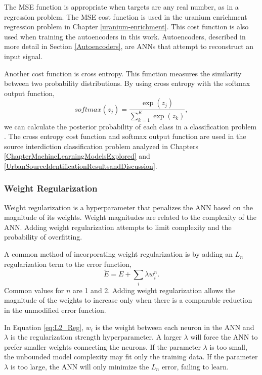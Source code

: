 The MSE function is appropriate when targets are any real number, as in a regression problem. The MSE cost function is used in the uranium enrichment regression problem in Chapter \ref{uranium-enrichment}. This cost function is also used when training the autoencoders in this work. Autoencoders, described in more detail in Section \ref{Autoencoders}, are ANNs that attempt to reconstruct an input signal.

Another cost function is cross entropy. This function measures the similarity between two probability distributions. By using cross entropy with the softmax output function,
%
\begin{equation} \label{eq:softmax}
softmax(z_j) = \frac{\exp(z_j)} {\sum_{k=1}^{K} \exp(z_k)},
\end{equation}
%
we can calculate the posterior probability of each class in a classification problem \cite{Bridle1990}. The cross entropy cost function and softmax output function are used in the source interdiction classification problem analyzed in Chapters \ref{ChapterMachineLearningModelsExplored} and \ref{UrbanSourceIdentificationResultsandDiscussion}.



\subsubsection{Weight Regularization}

Weight regularization is a hyperparameter that penalizes the ANN based on the magnitude of its weights. Weight magnitudes are related to the complexity of the ANN. Adding weight regularization attempts to limit complexity and the probability of overfitting.

A common method of incorporating weight regularization is by adding an $L_n$ regularization term to the error function, 
%
\begin{equation} \label{eq:L2_Reg}
\tilde{E} = E + \sum_i \lambda w_i^n.
\end{equation}
%
Common values for $n$ are 1 and 2. Adding weight regularization allows the magnitude of the weights to increase only when there is a comparable reduction in the unmodified error function.

In Equation \ref{eq:L2_Reg}, $w_i$ is the weight between each neuron in the ANN and $\lambda$ is the regularization strength hyperparameter. A larger $\lambda$ will force the ANN to prefer smaller weights connecting the neurons. If the parameter $\lambda$ is too small, the unbounded model complexity may fit only the training data. If the parameter $\lambda$ is too large, the ANN will only minimize the $L_n$ error, failing to learn.

